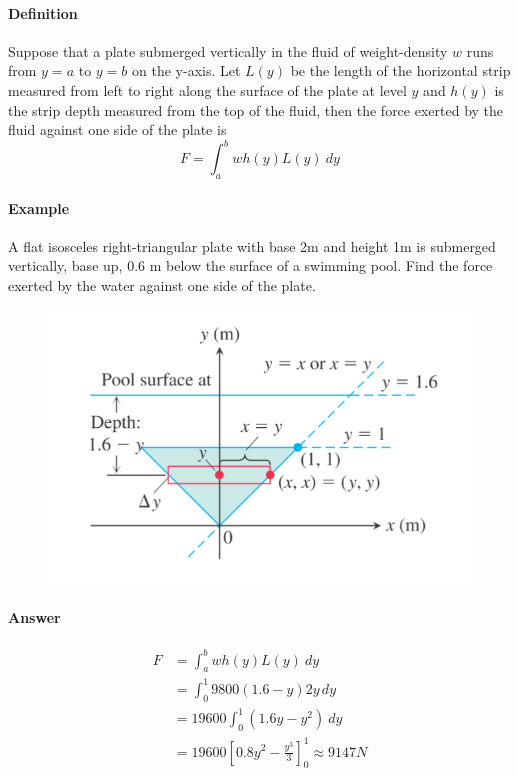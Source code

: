 \documentclass[12pt]{article}
\begin{document}
\paragraph{Definition}
Suppose that a plate submerged vertically in the fluid of weight-density $w$ runs from 
$y = a$ to $y = b$ on the y-axis. Let $L(y)$ be the length of the horizontal strip measured from left to right along the surface of the plate
at level $y$ and $h(y)$ is the strip depth measured from the top of the fluid, then the force exerted by the fluid against one side of the plate is 
\[
    F = \int_a^b wh(y)L(y)\: dy
\]

\paragraph{Example}
A flat isosceles right-triangular plate with base 2m and height 1m is
submerged vertically, base up, 0.6 m below the surface of a swimming pool. Find the force
exerted by the water against one side of the plate.

\begin{figure}[H]
    \centering
    \includegraphics[width = 0.4\linewidth]{Images/fluid force ex.png}
\end{figure}

\paragraph{Answer}
\begin{align*} 
    F &= \int_a^b wh(y)L(y)\: dy \\
    &= \int_0^1 9800(1.6 - y)2y\, dy \\
    &= 19600 \int_0^1 (1.6y - y^2)\: dy \\
    &= 19600 \left[0.8y^2 - \frac{y^3}{3} \right]^1_0 \approx 9147 N
\end{align*}
\end{document}
